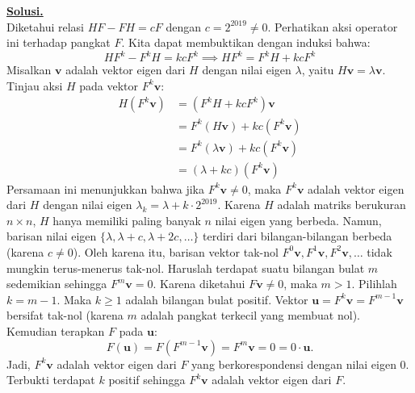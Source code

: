 \documentclass[12pt,twoside]{article}
\newenvironment{solution}
{
	\par\noindent\textbf{\underline{Solusi.}}\\
}
{
	\par
}
\begin{document}
\begin{enumerate}
        \begin{solution}
          Diketahui relasi $HF - FH = cF$ dengan $c = 2^{2019} \neq 0$.
          Perhatikan aksi operator ini terhadap pangkat $F$. Kita dapat membuktikan dengan induksi bahwa:
          \[ H F^k - F^k H = k c F^k \implies H F^k = F^k H + k c F^k \]
          Misalkan $\mathbf{v}$ adalah vektor eigen dari $H$ dengan nilai eigen $\lambda$, yaitu $H\mathbf{v} = \lambda \mathbf{v}$.
          Tinjau aksi $H$ pada vektor $F^k \mathbf{v}$:
          \begin{align*}
            H (F^k \mathbf{v}) & = (F^k H + k c F^k) \mathbf{v}                    \\
                               & = F^k (H \mathbf{v}) + k c (F^k \mathbf{v})       \\
                               & = F^k (\lambda \mathbf{v}) + k c (F^k \mathbf{v}) \\
                               & = (\lambda + kc) (F^k \mathbf{v})
          \end{align*}
          Persamaan ini menunjukkan bahwa jika $F^k \mathbf{v} \neq 0$, maka $F^k \mathbf{v}$ adalah vektor eigen dari $H$ dengan nilai eigen $\lambda_k = \lambda + k \cdot 2^{2019}$.
          Karena $H$ adalah matriks berukuran $n \times n$, $H$ hanya memiliki paling banyak $n$ nilai eigen yang berbeda.
          Namun, barisan nilai eigen $\{\lambda, \lambda+c, \lambda+2c, \dots \}$ terdiri dari bilangan-bilangan berbeda (karena $c \neq 0$).
          Oleh karena itu, barisan vektor tak-nol $F^0\mathbf{v}, F^1\mathbf{v}, F^2\mathbf{v}, \dots$ tidak mungkin terus-menerus tak-nol.
          Haruslah terdapat suatu bilangan bulat $m$ sedemikian sehingga $F^m \mathbf{v} = 0$.
          Karena diketahui $F\mathbf{v} \neq 0$, maka $m > 1$.
          Pilihlah $k = m-1$. Maka $k \ge 1$ adalah bilangan bulat positif.
          Vektor $\mathbf{u} = F^k \mathbf{v} = F^{m-1} \mathbf{v}$ bersifat tak-nol (karena $m$ adalah pangkat terkecil yang membuat nol).
          Kemudian terapkan $F$ pada $\mathbf{u}$:
          \[ F(\mathbf{u}) = F(F^{m-1} \mathbf{v}) = F^m \mathbf{v} = 0 = 0 \cdot \mathbf{u}. \]
          Jadi, $F^k \mathbf{v}$ adalah vektor eigen dari $F$ yang berkorespondensi dengan nilai eigen $0$.
          Terbukti terdapat $k$ positif sehingga $F^k \mathbf{v}$ adalah vektor eigen dari $F$.
        \end{solution}
\end{enumerate}
\pagebreak
\end{document}
